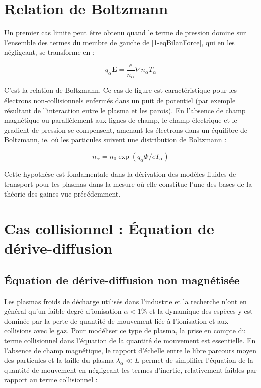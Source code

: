 \begin{refsection}
\section{Relation de Boltzmann}

Un premier cas limite peut être obtenu quand le terme de pression domine
sur l'ensemble des termes du membre de gauche de \eqref{1-eqBilanForce}, qui en
les négligeant, se transforme en :

\begin{equation}
\label{1-equilibreBoltzman}
q_\alpha\mathbf
E =\frac{e}{n_\alpha}\nabla n_\alpha T_\alpha
\end{equation}

C'est la relation de Boltzmann. Ce cas de figure est caractéristique pour les
électrons non-collisionnels enfermés dans un puit de potentiel (par exemple résultant de
l'interaction entre le plasma et les parois). En l'absence de champ magnétique
ou parallèlement aux lignes de champ, le champ électrique et le gradient de
pression se compensent, amenant les électrons dans un équilibre de Boltzmann,
ie. où les particules suivent une distribution de Boltzmann :

\begin{equation}
\label{1-profilBoltzman}
n_\alpha=n_0\exp(q_\alpha \Phi/eT_\alpha)
\end{equation}

Cette hypothèse est fondamentale dans la dérivation des modèles fluides de
transport pour les plasmas dans la mesure où elle constitue l'une des bases de
la théorie des gaines vue précédemment. 

\section{Cas collisionnel : Équation de dérive-diffusion}
\label{1-transportAmbipolaire}
\subsection{Équation de dérive-diffusion non magnétisée}
Les plasmas froids de décharge utilisés dans l'industrie et la recherche n'ont
en général qu'un faible degré d'ionisation $\alpha<$1\% et la dynamique des
espèces y est dominée par la perte de quantité de mouvement liée à l'ionisation
et aux collisions avec le gaz. Pour modéliser ce type de plasma, la prise en
compte du terme collisionnel dans l'équation de la quantité de mouvement est
essentielle.
En l'absence de champ magnétique, le rapport d'échelle entre le libre parcours moyen des particules
et la taille du plasma $\lambda_\alpha\ll L$ permet de simplifier l'équation de
la quantité de mouvement en négligeant les termes d'inertie, relativement
faibles par rapport au terme collisionnel :


\end{refsection}
